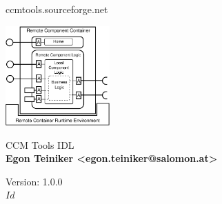 \begin{titlepage}

\centering

\vspace*{20mm}
{\huge ccmtools.sourceforge.net }
\vspace{20 mm}

\centerline{\includegraphics[width=40mm]{figures/LocalAdapterConcept.eps}}

\vspace{30mm}

{\Huge CCM Tools IDL }\\ 
\vspace{5mm}
{\bf Egon Teiniker <egon.teiniker@salomon.at>}\\
\vspace{30mm}


{\Large Version: 1.0.0} \\
\vspace{5mm}
$Id$
\end{titlepage}